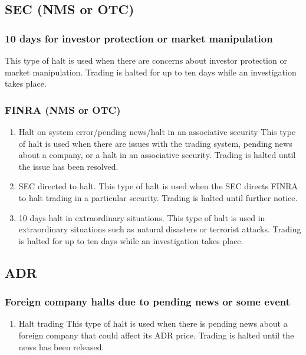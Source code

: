 \documentclass[11pt]{article}
\begin{document}
\subsection{SEC (NMS or OTC)}
\label{sec:org3777ba3}
\subsubsection{10 days for investor protection or market manipulation}
\label{sec:org2fed213}
This type of halt is used when there are concerns about investor protection or market manipulation. Trading is halted for up to ten days while an investigation takes place.
\subsubsection{FINRA (NMS or OTC)}
\label{sec:orgbacf284}
\begin{enumerate}
\item Halt on system error/pending news/halt in an associative security
\label{sec:orgb69b160}
This type of halt is used when there are issues with the trading system, pending news about a company, or a halt in an associative security. Trading is halted until the issue has been resolved.
\item SEC directed to halt.
\label{sec:orge9f7891}
This type of halt is used when the SEC directs FINRA to halt trading in a particular security. Trading is halted until further notice.
\item 10 days halt in extraordinary situations.
\label{sec:orgd09030f}
This type of halt is used in extraordinary situations such as natural disasters or terrorist attacks. Trading is halted for up to ten days while an investigation takes place.
\end{enumerate}
\subsection{ADR}
\label{sec:orgb11cb16}
\subsubsection{Foreign company halts due to pending news or some event}
\label{sec:org475ddcf}
\begin{enumerate}
\item Halt trading
\label{sec:org076145e}
This type of halt is used when there is pending news about a foreign company that could affect its ADR price. Trading is halted until the news has been released.
\end{enumerate}
\end{document}
